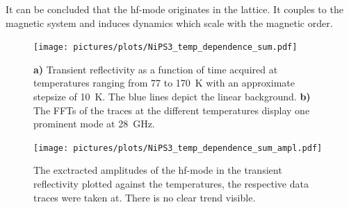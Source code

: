 It can be concluded that the hf-mode originates in the lattice.
It couples to the magnetic system and induces dynamics which scale with the magnetic order.
\begin{figure}[hbt!]
    \centering
    \texttt{[image: pictures/plots/NiPS3\_temp\_dependence\_sum.pdf]} \vspace{-0.3cm}
    \caption{\textbf{a)} Transient reflectivity as a function of time acquired at temperatures ranging from 77 to \qty{170}{K} with an approximate stepsize of \qty{10}{K}. The blue lines depict the linear background. \textbf{b)} The FFTs of the traces at the different temperatures display one prominent mode at \qty{28}{GHz}.}
    \label{fig:NiPS3_temp_dependence_sum}
\end{figure}
\begin{figure}[hbt!]
    \centering  
    \texttt{[image: pictures/plots/NiPS3\_temp\_dependence\_sum\_ampl.pdf]} \vspace{-0.3cm}
    \caption{The exctracted amplitudes of the hf-mode in the transient reflectivity plotted against the temperatures, the respective data traces were taken at. There is no clear trend visible.}
    \label{fig:NiPS3_temp_dependence_sum_ampl}
\end{figure}
\FloatBarrier


